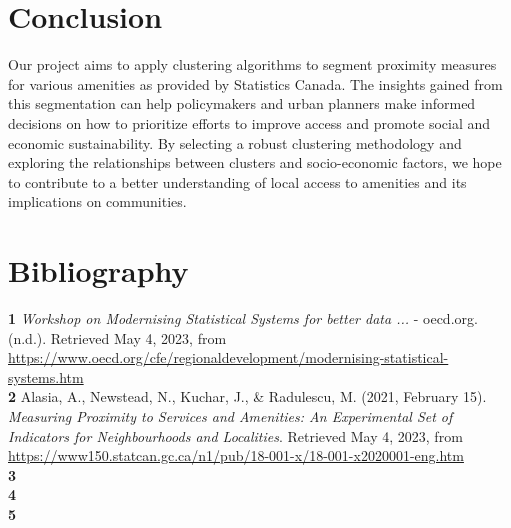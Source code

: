 \documentclass[11pt, a4paper]{article}
\begin{document}
\section*{Conclusion}


Our project aims to apply clustering algorithms to segment proximity measures for various amenities as provided by Statistics Canada. The insights gained from this segmentation can help policymakers and urban planners make informed decisions on how to prioritize efforts to improve access and promote social and economic sustainability. By selecting a robust clustering methodology and exploring the relationships between clusters and socio-economic factors, we hope to contribute to a better understanding of local access to amenities and its implications on communities. 






\section*{Bibliography}


\textbf{1} \textit{Workshop on Modernising Statistical Systems for better data ...} - oecd.org. (n.d.). Retrieved May 4, 2023, from \sloppy\url{https://www.oecd.org/cfe/regionaldevelopment/modernising-statistical-systems.htm} \\ 

\noindent\textbf{2} Alasia, A., Newstead, N., Kuchar, J., \& Radulescu, M. (2021, February 15). \textit{Measuring Proximity to Services and Amenities: An Experimental Set of Indicators for Neighbourhoods and Localities}. Retrieved May 4, 2023, from \sloppy\url{https://www150.statcan.gc.ca/n1/pub/18-001-x/18-001-x2020001-eng.htm}  \\ 

\noindent\textbf{3} \\ 

\noindent\textbf{4} \\ 

\noindent\textbf{5} \\ 
\end{document}
